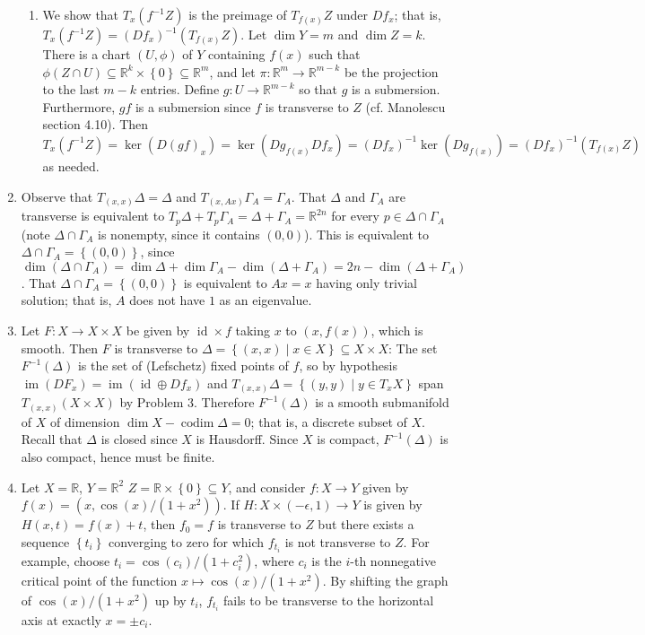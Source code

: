 \documentclass[11pt,leqno]{article}
\theoremstyle{plain}
\theoremstyle{definition}
\numberwithin{equation}{section}
\numberwithin{lem}{section}
\newcommand{\cbr}[1]{\left\{#1\right\}}
\DeclareMathOperator{\im}{im}
\DeclareMathOperator{\id}{id}
\DeclareMathOperator{\codim}{codim}
\begin{document}
\begin{enumerate}
\begin{enumerate}
        \item We show that $T_x(f^{-1}Z)$ is the preimage of $T_{f(x)}Z$ under $Df_x$; that is, $T_x(f^{-1}Z) = (Df_x)^{-1}(T_{f(x)}Z)$. Let $\dim Y = m$ and $\dim Z = k$. There is a chart $(U,\phi)$ of $Y$ containing $f(x)$ such that $\phi(Z\cap U)\subseteq \mathbb R^k\times\cbr{0}\subseteq \mathbb R^m$, and let $\pi\colon \mathbb R^m\to \mathbb R^{m-k}$ be the projection to the last $m-k$ entries. Define $g\colon U\to \mathbb R^{m-k}$ so that $g$ is a submersion. Furthermore, $gf$ is a submersion since $f$ is transverse to $Z$ (cf. Manolescu section 4.10). Then $T_x(f^{-1}Z) = \ker(D(gf)_x) = \ker(Dg_{f(x)}Df_x) = (Df_x)^{-1}\ker(Dg_{f(x)}) = (Df_x)^{-1}(T_{f(x)}Z)$ as needed.
    \end{enumerate}
    \item Observe that $T_{(x,x)}\Delta = \Delta$ and $T_{(x,Ax)}\Gamma_A = \Gamma_A$. That $\Delta$ and $\Gamma_A$ are transverse is equivalent to $T_p\Delta+T_p\Gamma_A = \Delta+\Gamma_A = \mathbb R^{2n}$ for every $p\in \Delta\cap \Gamma_A$ (note $\Delta\cap \Gamma_A$ is nonempty, since it contains $(0,0)$). This is equivalent to $\Delta\cap \Gamma_A = \cbr{(0,0)}$, since $\dim(\Delta\cap \Gamma_A) = \dim\Delta + \dim\Gamma_A - \dim(\Delta + \Gamma_A) = 2n- \dim(\Delta + \Gamma_A)$. That $\Delta\cap \Gamma_A = \cbr{(0,0)}$ is equivalent to $Ax= x$ having only trivial solution; that is, $A$ does not have $1$ as an eigenvalue. 
    \item Let $F\colon X\to X\times X$ be given by $\id\times f$ taking $x$ to $(x,f(x))$, which is smooth. Then $F$ is transverse to $\Delta = \cbr{(x,x)\mid x\in X}\subseteq X\times X$: The set $F^{-1}(\Delta)$ is the set of (Lefschetz) fixed points of $f$, so by hypothesis $\im(DF_x) = \im(\id \oplus Df_x)$ and $T_{(x,x)}\Delta = \cbr{(y,y)\mid y\in T_xX}$ span $T_{(x,x)}(X\times X)$ by Problem 3. Therefore $F^{-1}(\Delta)$ is a smooth submanifold of $X$ of dimension $\dim X-\codim \Delta = 0$; that is, a discrete subset of $X$. Recall that $\Delta$ is closed since $X$ is Hausdorff. Since $X$ is compact, $F^{-1}(\Delta)$ is also compact, hence must be finite.
    \item Let $X = \mathbb R$, $Y = \mathbb R^2$ $Z = \mathbb R\times \cbr{0}\subseteq Y$, and consider $f\colon X\to Y$ given by $f(x) = (x,\cos(x)/(1+x^2))$. If $H\colon X\times (-\epsilon,1)\to Y$ is given by $H(x,t) = f(x)+t$, then $f_0 = f$ is transverse to $Z$ but there exists a sequence $\cbr{t_i}$ converging to zero for which $f_{t_i}$ is not transverse to $Z$. For example, choose $t_i = \cos(c_i)/(1+c_i^2)$, where $c_i$ is the $i$-th nonnegative critical point of the function $x\mapsto \cos(x)/(1+x^2)$. By shifting the graph of $\cos(x)/(1+x^2)$ up by $t_i$, $f_{t_i}$ fails to be transverse to the horizontal axis at exactly $x= \pm c_i$.

\end{enumerate}
\end{document}
